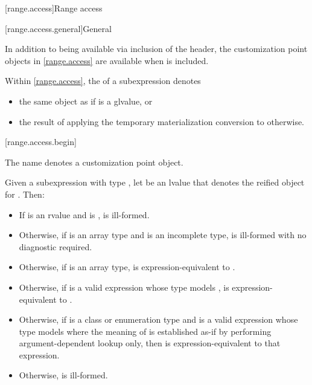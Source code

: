 [range.access]{Range access}

[range.access.general]{General}

\pnum
In addition to being available via inclusion of the 
header, the customization point objects in \ref{range.access} are
available when  is included.

\pnum
Within \ref{range.access},
the  of a subexpression  denotes
\begin{itemize}
\item
the same object as  if  is a glvalue, or
\item
the result of applying
the temporary materialization conversion to  otherwise.
\end{itemize}

[range.access.begin]{}
%

\pnum
The name  denotes a customization point
object.

\pnum
Given a subexpression  with type ,
let  be an lvalue that denotes the reified object for .
Then:

\begin{itemize}
\item
  If  is an rvalue and
   is ,
   is ill-formed.

\item
  Otherwise, if  is an array type and
   is an incomplete type,
   is ill-formed with no diagnostic required.

\item
  Otherwise, if  is an array type,
   is expression-equivalent to .

\item
  Otherwise, if 
  is a valid expression whose type models
  ,
   is expression-equivalent to
  .

\item
  Otherwise, if  is a class or enumeration type and
  is a valid expression whose type models
  where the meaning of  is established as-if by performing
  argument-dependent lookup only,
  then  is expression-equivalent to
  that expression.

\item
  Otherwise,  is ill-formed.
\end{itemize}

